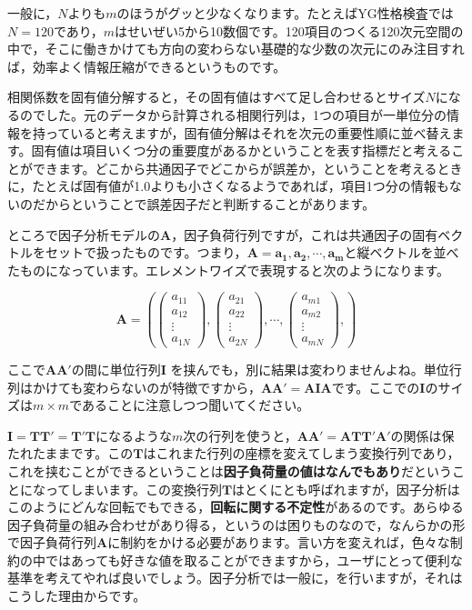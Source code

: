 \documentclass{ltjsbook}
\begin{document}
一般に，$N$よりも$m$のほうがグッと少なくなります。たとえばYG性格検査では$N=120$であり，$m$はせいぜい5から10数個です。120項目のつくる120次元空間の中で，そこに働きかけても方向の変わらない基礎的な少数の次元にのみ注目すれば，効率よく情報圧縮ができるというものです。

相関係数を固有値分解すると，その固有値はすべて足し合わせるとサイズ$N$になるのでした。元のデータから計算される相関行列は，1つの項目が一単位分の情報を持っていると考えますが，固有値分解はそれを次元の重要性順に並べ替えます。固有値は項目いくつ分の重要度があるかということを表す指標だと考えることができます。どこから共通因子でどこからが誤差か，ということを考えるときに，たとえば固有値が1.0よりも小さくなるようであれば，項目1つ分の情報もないのだからということで誤差因子だと判断することがあります。

ところで因子分析モデルの$\bm{A}$，因子負荷行列ですが，これは共通因子の固有ベクトルをセットで扱ったものです。つまり，$\bm{A} = \bm{a_1,a_2,\cdots,a_m}$と縦ベクトルを並べたものになっています。エレメントワイズで表現すると次のようになります。

\[
	\bm{A} = \left (
	\begin{pmatrix}  a_{11}\\a_{12}\\\vdots\\ a_{1N} \end{pmatrix},
	\begin{pmatrix}  a_{21}\\a_{22}\\\vdots\\ a_{2N} \end{pmatrix},
	\cdots,
	\begin{pmatrix}  a_{m1}\\a_{m2}\\\vdots\\ a_{mN} \end{pmatrix},
	\right )
\]

ここで$\bm{AA'}$の間に単位行列$\bm{I}$ を挟んでも，別に結果は変わりませんよね。単位行列はかけても変わらないのが特徴ですから，$\bm{AA'}=\bm{AIA}$です。ここでの$\bm{I}$のサイズは$m \times m$であることに注意しつつ聞いてください。

$\bm{I} = \bm{TT'}=\bm{T'T}$になるような$m$次の行列を使うと，$\bm{AA'} = \bm{ATT'A'}$の関係は保たれたままです。この$\bm{T}$はこれまた行列の座標を変えてしまう変換行列であり，これを挟むことができるということは\textbf{因子負荷量の値はなんでもあり}だということになってしまいます。この変換行列$\bm{T}$はとくにとも呼ばれますが，因子分析はこのようにどんな回転でもできる，\textbf{回転に関する不定性}があるのです。あらゆる因子負荷量の組み合わせがあり得る，というのは困りものなので，なんらかの形で因子負荷行列$\bm{A}$に制約をかける必要があります。言い方を変えれば，色々な制約の中ではあっても好きな値を取ることができますから，ユーザにとって便利な基準を考えてやれば良いでしょう。因子分析では一般に，を行いますが，それはこうした理由からです。
\end{document}
